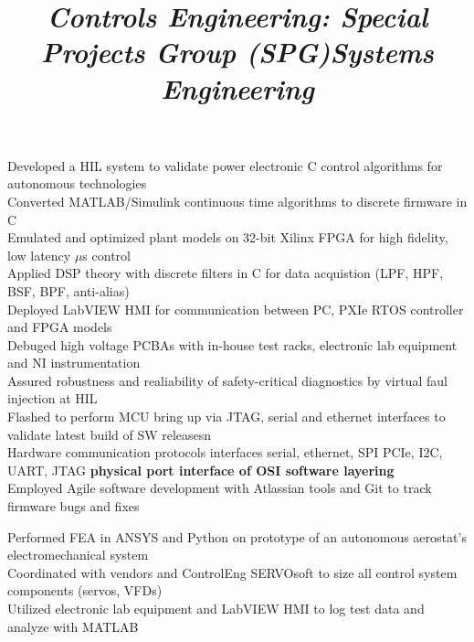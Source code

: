 \documentclass[mm]{res}
\newcommand{\tb}{\textbullet \xspace}
\begin{document}
\begin{resume}
\title{\textsl{Controls Engineering: Special Projects Group (SPG)}}
\begin{position}
\tb Developed a HIL system to validate power electronic C control algorithms for autonomous technologies\\
\tb Converted MATLAB/Simulink continuous time algorithms to discrete firmware in C \\
\tb Emulated and optimized plant models on 32-bit Xilinx FPGA for high fidelity, low latency $\mu$s control \\
\tb Applied DSP theory with discrete filters in C for data acquistion (LPF, HPF, BSF, BPF, anti-alias) \\
\tb Deployed LabVIEW HMI for communication between PC, PXIe RTOS controller and FPGA models \\
\tb Debuged high voltage PCBAs with in-house test racks, electronic lab equipment and NI instrumentation \\
\tb Assured robustness and realiability of safety-critical diagnostics by virtual faul injection at HIL\\
\tb Flashed to perform MCU bring up via JTAG, serial and ethernet interfaces to validate latest build of SW releasesn \\
\tb Hardware communication protocols interfaces serial, ethernet, SPI PCIe, I2C, UART, JTAG \textbf{physical port interface of OSI software layering} \\
\tb Employed Agile software development with Atlassian tools and Git to track firmware bugs and fixes
\end{position}

\title{\textsl{Systems Engineering}}
\begin{position}
\tb Performed FEA in ANSYS and Python on prototype of an autonomous aerostat's electromechanical system \\
\tb Coordinated with vendors and ControlEng SERVOsoft to size all control system components (servos, VFDs) \\
\tb Utilized electronic lab equipment and LabVIEW HMI to log test data and analyze with MATLAB
\end{position}


\end{resume}
\end{document}
